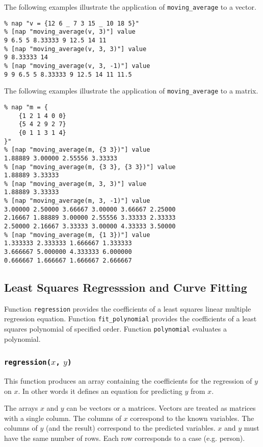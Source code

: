 The following examples illustrate the application of 
\texttt{moving\_average} to a vector.
\begin{verbatim}
% nap "v = {12 6 _ 7 3 15 _ 10 18 5}"
% [nap "moving_average(v, 3)"] value
9 6.5 5 8.33333 9 12.5 14 11
% [nap "moving_average(v, 3, 3)"] value
9 8.33333 14
% [nap "moving_average(v, 3, -1)"] value
9 9 6.5 5 8.33333 9 12.5 14 11 11.5
\end{verbatim}

  

The following examples illustrate the application of 
  \texttt{moving\_average} to a matrix.
  \begin{verbatim}
% nap "m = {
    {1 2 1 4 0 0}
    {5 4 2 9 2 7}
    {0 1 1 3 1 4}
}"
% [nap "moving_average(m, {3 3})"] value
1.88889 3.00000 2.55556 3.33333
% [nap "moving_average(m, {3 3}, {3 3})"] value
1.88889 3.33333
% [nap "moving_average(m, 3, 3)"] value
1.88889 3.33333
% [nap "moving_average(m, 3, -1)"] value
3.00000 2.50000 3.66667 3.00000 3.66667 2.25000
2.16667 1.88889 3.00000 2.55556 3.33333 2.33333
2.50000 2.16667 3.33333 3.00000 4.33333 3.50000
% [nap "moving_average(m, {1 3})"] value
1.333333 2.333333 1.666667 1.333333
3.666667 5.000000 4.333333 6.000000
0.666667 1.666667 1.666667 2.666667
\end{verbatim}

\subsection{Least Squares Regresssion and Curve Fitting}
    \label{least-squares}

Function \texttt{regression} provides the coefficients of a least squares 
linear multiple regression equation.
Function \texttt{fit\_polynomial} provides the coefficients of a least squares polynomial of
specified order.
Function \texttt{polynomial} evaluates a polynomial.

\subsubsection{\texttt{regression(}$x$\texttt{,} $y$\texttt{)}}
    \label{regression}

This function produces an array containing
the coefficients for the regression of $y$ on $x$.
In other words it defines an equation for predicting $y$ from $x$.

The arrays $x$ and $y$ can be vectors or a matrices.
Vectors are treated as matrices with a single column.
The columns of $x$ correspond to the known variables.
The columns of $y$ (and the result) correspond to the predicted variables.
$x$ and $y$ must have the same number of rows.
Each row corresponds to a case (e.g. person).

